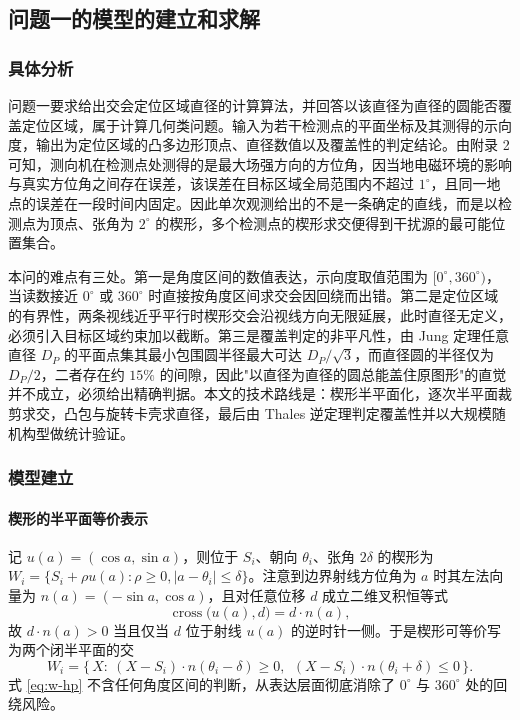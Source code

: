
\subsection{问题一的模型的建立和求解}
\subsubsection{具体分析}

问题一要求给出交会定位区域直径的计算算法，并回答以该直径为直径的圆能否覆盖定位区域，属于计算几何类问题。输入为若干检测点的平面坐标及其测得的示向度，输出为定位区域的凸多边形顶点、直径数值以及覆盖性的判定结论。由附录 2 可知，测向机在检测点处测得的是最大场强方向的方位角，因当地电磁环境的影响与真实方位角之间存在误差，该误差在目标区域全局范围内不超过 $1^\circ$，且同一地点的误差在一段时间内固定。因此单次观测给出的不是一条确定的直线，而是以检测点为顶点、张角为 $2^\circ$ 的楔形，多个检测点的楔形求交便得到干扰源的最可能位置集合。

本问的难点有三处。第一是角度区间的数值表达，示向度取值范围为 $[0^\circ,360^\circ)$，当读数接近 $0^\circ$ 或 $360^\circ$ 时直接按角度区间求交会因回绕而出错。第二是定位区域的有界性，两条视线近乎平行时楔形交会沿视线方向无限延展，此时直径无定义，必须引入目标区域约束加以截断。第三是覆盖判定的非平凡性，由 Jung 定理任意直径 $D_P$ 的平面点集其最小包围圆半径最大可达 $D_P/\sqrt3$，而直径圆的半径仅为 $D_P/2$，二者存在约 $15\%$ 的间隙，因此"以直径为直径的圆总能盖住原图形"的直觉并不成立，必须给出精确判据。本文的技术路线是：楔形半平面化，逐次半平面裁剪求交，凸包与旋转卡壳求直径，最后由 Thales 逆定理判定覆盖性并以大规模随机构型做统计验证。

\subsubsection{模型建立}

\paragraph{楔形的半平面等价表示} 记 $u(a)=(\cos a,\sin a)$，则位于 $S_i$、朝向 $\theta_i$、张角 $2\delta$ 的楔形为 $W_i=\{S_i+\rho u(a):\rho\ge0,\lvert a-\theta_i\rvert\le\delta\}$。注意到边界射线方位角为 $a$ 时其左法向量为 $n(a)=(-\sin a,\cos a)$，且对任意位移 $d$ 成立二维叉积恒等式
\begin{equation}
\operatorname{cross}\bigl(u(a),d\bigr)=d\cdot n(a),
\end{equation}
故 $d\cdot n(a)>0$ 当且仅当 $d$ 位于射线 $u(a)$ 的逆时针一侧。于是楔形可等价写为两个闭半平面的交
\begin{equation}
W_i=\bigl\{\,X:\ (X-S_i)\cdot n(\theta_i-\delta)\ge0,\ \ (X-S_i)\cdot n(\theta_i+\delta)\le0\,\bigr\}.
\label{eq:w-hp}
\end{equation}
式 \eqref{eq:w-hp} 不含任何角度区间的判断，从表达层面彻底消除了 $0^\circ$ 与 $360^\circ$ 处的回绕风险。

